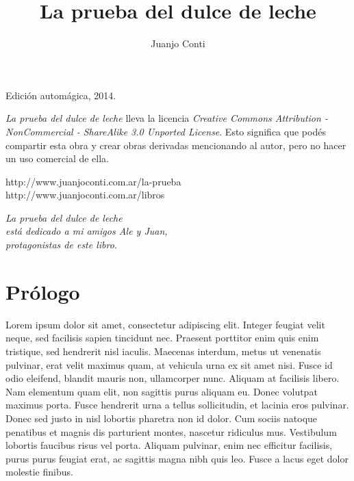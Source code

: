 \documentclass[12pt,twoside,openright,a5paper]{book}
\title{La prueba del dulce de leche}
\author{Juanjo Conti}
\date{}
\begin{document}
\pagestyle{plain}

\maketitle


\thispagestyle{empty}
\noindent
Edición automágica, 2014.\\

\vspace{0.5cm}

\noindent
\emph{La prueba del dulce de leche} lleva la licencia 
\emph{Creative Commons Attribution - NonCommercial - ShareAlike 3.0 Unported License}.
Esto significa que podés compartir esta obra y crear obras derivadas
mencionando al autor, pero no ha\-cer un uso comercial de ella.

\vfill

\noindent
http://www.juanjoconti.com.ar/la-prueba\\

\noindent
http://www.juanjoconti.com.ar/libros

\cleardoublepage

\noindent
\begin{flushright}
\emph{
\emph{La prueba del dulce de leche}\\
está dedicado a mi amigos Ale y Juan,\\
protagonistas de este libro.
}
\end{flushright}

\cleardoublepage

\renewcommand*\contentsname{Índice}

\tableofcontents

\chapter*{Prólogo}

Lorem ipsum dolor sit amet, consectetur adipiscing elit. Integer feugiat velit neque, sed facilisis sapien tincidunt nec. Praesent porttitor enim quis enim tristique, sed hendrerit nisl iaculis. Maecenas interdum, metus ut venenatis pulvinar, erat velit maximus quam, at vehicula urna ex sit amet nisi. Fusce id odio eleifend, blandit mauris non, ullamcorper nunc. Aliquam at facilisis libero. Nam elementum quam elit, non sagittis purus aliquam eu. Donec volutpat maximus porta. Fusce hendrerit urna a tellus sollicitudin, et lacinia eros pulvinar. Donec sed justo in nisl lobortis pharetra non id dolor. Cum sociis natoque penatibus et magnis dis parturient montes, nascetur ridiculus mus. Vestibulum lobortis faucibus risus vel porta. Aliquam pulvinar, enim nec efficitur facilisis, purus purus feugiat erat, ac sagittis magna nibh quis leo. Fusce a lacus eget dolor molestie finibus.
\end{document}
